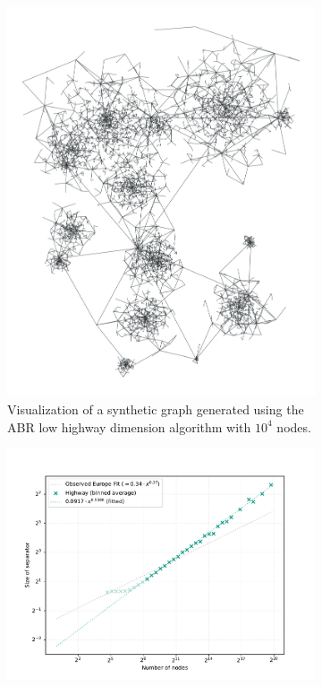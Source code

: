 \begin{figure}[tbhp]
	\centering
    \begin{subfigure}[t]{0.38\linewidth}
		\centering
		\includegraphics[height=\linewidth, angle=90]{graphics/highway.png}
		\caption{Visualization of a synthetic graph generated using the ABR low highway dimension algorithm with \(10^4\) nodes.}
		\label{fig:abr_graph_viz}
	\end{subfigure}
	\hfill
    \begin{subfigure}[t]{0.55\linewidth}
		\centering
		\includegraphics[width=\linewidth]{graphics/sep_highway.pdf}

\end{subfigure}
\end{figure}

